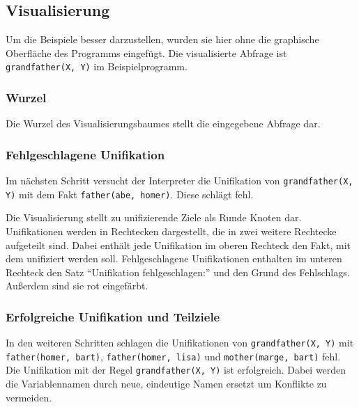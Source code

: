 \documentclass[parskip=full,11pt,twoside]{scrartcl}
\begin{document}
\subsection{Visualisierung}

Um die Beispiele besser darzustellen, wurden sie hier ohne die graphische Oberfläche des Programms eingefügt.
Die visualisierte Abfrage ist \texttt{grandfather(X, Y)} im Beispielprogramm.

\subsubsection{Wurzel}

\begin{minipage}{\linewidth}
\end{minipage}

Die Wurzel des Visualisierungsbaumes stellt die eingegebene Abfrage dar.

\subsubsection{Fehlgeschlagene Unifikation}

Im nächsten Schritt versucht der Interpreter die Unifikation von \texttt{grandfather(X, Y)} mit dem Fakt \texttt{father(abe, homer)}.
Diese schlägt fehl.

\begin{minipage}{\linewidth}
\end{minipage}

Die Visualisierung stellt zu unifizierende Ziele als Runde Knoten dar.
Unifikationen werden in  Rechtecken dargestellt, die in zwei weitere Rechtecke aufgeteilt sind.
Dabei enthält jede Unifikation im oberen Rechteck den Fakt, mit dem unifiziert werden soll.
Fehlgeschlagene Unifikationen enthalten im unteren Rechteck den Satz \enquote{Unifikation fehlgeschlagen:} und den Grund des Fehlschlags.
Außerdem sind sie rot eingefärbt.

\subsubsection{Erfolgreiche Unifikation und Teilziele}

In den weiteren Schritten schlagen die Unifikationen von \texttt{grandfather(X, Y)} mit \texttt{father(homer, bart)}, \texttt{father(homer, lisa)} und \texttt{mother(marge, bart)} fehl.
Die Unifikation mit der Regel \texttt{grandfather(X, Y)} ist erfolgreich.
Dabei werden die Variablennamen durch neue, eindeutige Namen ersetzt um Konflikte zu vermeiden.
\end{document}

